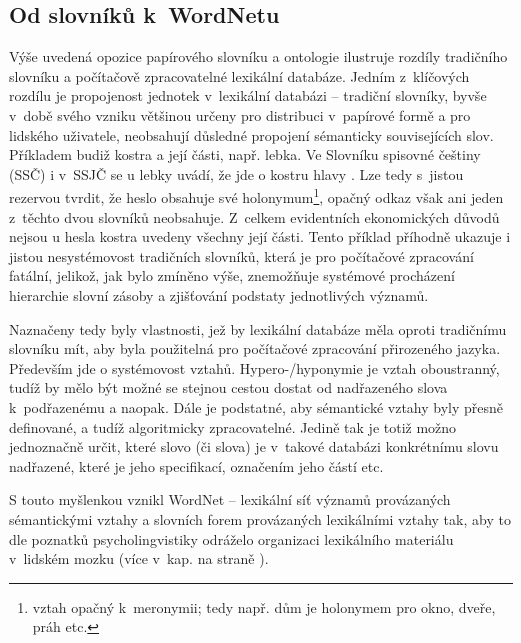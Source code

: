 \documentclass[a4paper,11pt,openany,twoside]{book}
\newcommand{\td}[2][]{
	{\hskip -0.5em\todo[size=\footnotesize]{#2}}
}
\newcommand{\itNameRef}[1]{\textit{\nameref{#1}}}
\newcommand\ex{\textsf}
\begin{document}
				\subsection{Od slovníků k~WordNetu}

					Výše uvedená opozice papírového slovníku a ontologie ilustruje rozdíly tradičního slovníku a počítačově zpracovatelné lexikální databáze. Jedním z~klíčových rozdílu je propojenost jednotek v~lexikální databázi -- tradiční slovníky, byvše v~době svého vzniku většinou určeny pro distribuci v~papírové formě a pro lidského uživatele, neobsahují důsledné propojení sémanticky souvisejících slov. Příkladem budiž \ex{kostra} a její části, např. \ex{lebka}. Ve Slovníku spisovné češtiny (SSČ) i v~SSJČ se u \ex{lebky} uvádí, že jde o \ex{kostru hlavy} \parencite{Havranek1989, filipec2005}. Lze tedy s~jistou rezervou tvrdit, že heslo obsahuje své holonymum\footnote{vztah opačný k~meronymii; tedy např. \ex{dům} je holonymem pro \ex{okno}, \ex{dveře}, \ex{práh} etc.}, opačný odkaz však ani jeden z~těchto dvou slovníků neobsahuje. Z~celkem evidentních ekonomických důvodů nejsou u hesla \ex{kostra} uvedeny všechny její části. Tento příklad příhodně ukazuje i jistou nesystémovost tradičních slovníků, která je pro počítačové zpracování fatální, jelikož, jak bylo zmíněno výše, znemožňuje systémové procházení hierarchie slovní zásoby a zjišťování podstaty jednotlivých významů.

					Naznačeny tedy byly vlastnosti, jež by lexikální databáze měla oproti tradičnímu slovníku mít, aby byla použitelná pro počítačové zpracování přirozeného jazyka. Především jde o systémovost vztahů. Hypero-/hyponymie je vztah oboustranný, tudíž by mělo být možné se stejnou cestou dostat od nadřazeného slova k~podřazenému a naopak. Dále je podstatné, aby sémantické vztahy byly přesně definované, a tudíž algoritmicky zpracovatelné. Jedině tak je totiž možno jednoznačně určit, které slovo (či slova) je v~takové databázi konkrétnímu slovu nadřazené, které je jeho specifikací, označením jeho částí etc. 

					S touto myšlenkou vznikl WordNet -- lexikální síť významů provázaných sémantickými vztahy a slovních forem provázaných lexikálními vztahy tak, aby to dle poznatků psycholingvistiky odráželo organizaci lexikálního materiálu v~lidském mozku (více v~kap. \itNameRef{cha:psycho} na straně \pageref{cha:psycho}). \parencite{pala2013vceska} 

\end{document}
